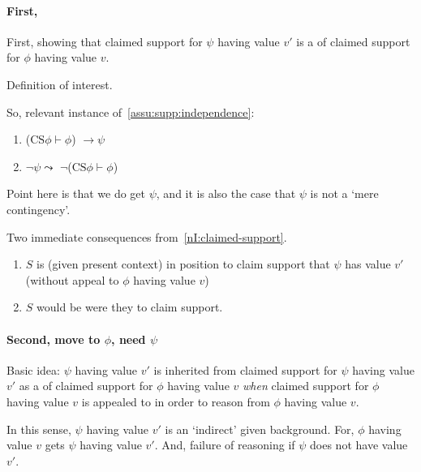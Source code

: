 \paragraph{First, \requ{}}

\begin{note}
  First, showing that claimed support for \(\psi\) having value \(v'\) is a \requ{} of claimed support for \(\phi\) having value \(v\).

  \begin{note}
    Definition of interest.
    \begin{quote}
      \vspace{-\baselineskip}
    \end{quote}
  \end{note}
\end{note}

\begin{note}
  So, relevant instance of~\autoref{assu:supp:independence}:
  \begin{enumerate}
  \item (\(\text{CS}\phi \vdash \phi\)) \(\rightarrow \psi\)
  \item \(\lnot\psi \leadsto\) \(\lnot\)(\(\text{CS}\phi \vdash \phi\))
  \end{enumerate}

  Point here is that we do get \(\psi\), and it is also the case that \(\psi\) is not a `mere contingency'.
\end{note}

\begin{note}
  Two immediate consequences from~\ref{nI:claimed-support}.
  \begin{enumerate}
  \item \(S\) is (given present context) in position to claim support that \(\psi\) has value \(v'\) (without appeal to \(\phi\) having value \(v\))
  \item \(S\) would be \nmom{} were they to claim support.
  \end{enumerate}
\end{note}

\paragraph{Second, move to \(\phi\), need \(\psi\)}

\begin{note}
  Basic idea:
  \(\psi\) having value \(v'\) is inherited from claimed support for \(\psi\) having value \(v'\) as a \requ{} of claimed support for \(\phi\) having value \(v\) \emph{when} claimed support for \(\phi\) having value \(v\) is appealed to in order to reason from \(\phi\) having value \(v\).

  In this sense, \(\psi\) having value \(v'\) is an `indirect' \requ{} given background.
  For, \(\phi\) having value \(v\) gets \(\psi\) having value \(v'\).
  And, failure of reasoning if \(\psi\) does not have value \(v'\).
\end{note}

